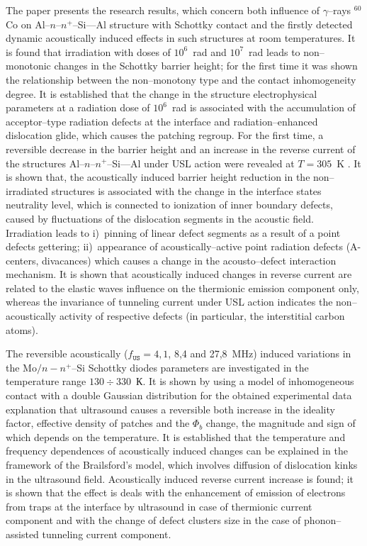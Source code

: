 The paper presents the research results, which concern both influence of $\gamma$--rays $^{60}$Co on Al--$n$--$n^+$--Si---Al structure with Schottky contact and
the firstly detected dynamic acoustically induced effects in such structures at room temperatures.
It is found that irradiation with doses of $10^6$~rad and $10^7$~rad leads to
non--monotonic changes in the Schottky barrier height;
for the first time it was shown the relationship between the non--monotony type and the contact inhomogeneity degree.
It is established that the change in the structure electrophysical parameters  at a radiation dose of $10^6$~rad
 is associated with the accumulation of acceptor--type radiation defects at the interface and 
 radiation--enhanced dislocation glide, which causes the patching regroup.
For the first time, a reversible decrease in the barrier height and an increase in the reverse current of the structures Al--$n$--$n^+$--Si---Al under USL action were revealed at $T=305$~K .
It is shown that, the acoustically induced barrier height reduction in the non--irradiated structures is associated with the change in the interface states neutrality level, which is connected to ionization of inner boundary defects, caused by fluctuations of the dislocation segments in the acoustic field.
Irradiation leads to
i)~pinning of linear defect segments as a result of a point defects gettering;
ii)~appearance of acoustically--active point radiation defects (A-centers, divacances)
which causes a change in the acousto--defect interaction mechanism.
It is shown that acoustically induced changes in reverse current are related to the elastic waves influence on the thermionic emission component only,
whereas the invariance of tunneling current under USL action indicates the  non--acoustically activity of respective
defects (in particular, the interstitial carbon atoms). 


The reversible acoustically ($f_\mathtt{US}=4,1$, 8,4 and 27,8~MHz)
induced variations in the Mo$/n-n^+$--Si Schottky diodes parameters are investigated in the temperature range $130\div330$~К.
It is shown by using a model of inhomogeneous contact with a double Gaussian distribution for the obtained experimental data explanation that ultrasound causes a reversible both increase in the ideality factor,  effective density of patches and the $\Phi_{b}$ change,
the magnitude and sign of which depends on the temperature.
It is established that the temperature and frequency dependences of acoustically induced changes can be explained in the framework of the Brailsford’s model,
which involves diffusion of dislocation kinks in the ultrasound field.
Acoustically induced reverse current increase is found;
it is shown that the effect is deals with the enhancement of emission of electrons from traps at the interface by ultrasound in case of thermionic current component
and with the change of defect clusters size in the case of phonon--assisted tunneling current component.


